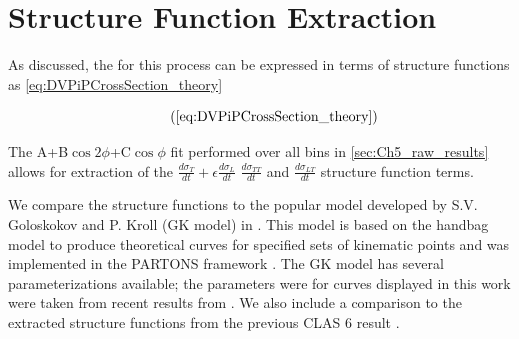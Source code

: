     \clearpage

\section{Structure Function Extraction}

    As discussed, the \xsec for this process can be expressed in terms of structure functions as \ref{eq:DVPiPCrossSection_theory}
    
        \begin{equation*}
             \recallLabel{eq:DVPiPCrossSection_theory}
        \end{equation*}

    The  A+B$\cos{2\phi}$+C$\cos{\phi}$ fit performed over all bins in \ref{sec:Ch5_raw_results} allows for extraction of the $\frac{d\sigma_T}{dt} + \epsilon \frac{d\sigma_L}{dt}$ $\frac{d\sigma_{TT}}{dt}$  and $\frac{d\sigma_{LT}}{dt}$ structure function terms. 

    We compare the structure functions to the popular model developed by S.V. Goloskokov and P. Kroll (GK model) \parencite{Goloskokov2010AnElectroproduction} in . This model is based on the handbag model to produce theoretical curves for specified sets of kinematic points and was implemented in the PARTONS framework \parencite{Berthou2018PARTONS:Software}. The GK model has several parameterizations available; the parameters were for curves displayed in this work were taken from recent results from \parencite{Diehl2020ExtractionKinematics}. We also include a comparison to the extracted structure functions from the previous CLAS 6 result \parencite{Bedlinskiy2014ExclusiveCLAS}.
    
   


